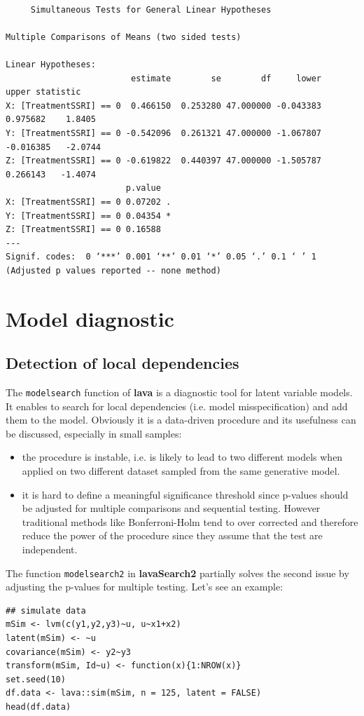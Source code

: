 \documentclass[12pt]{article}
\begin{document}
\begin{verbatim}

	 Simultaneous Tests for General Linear Hypotheses

Multiple Comparisons of Means (two sided tests) 

Linear Hypotheses:
                         estimate        se        df     lower     upper statistic
X: [TreatmentSSRI] == 0  0.466150  0.253280 47.000000 -0.043383  0.975682    1.8405
Y: [TreatmentSSRI] == 0 -0.542096  0.261321 47.000000 -1.067807 -0.016385   -2.0744
Z: [TreatmentSSRI] == 0 -0.619822  0.440397 47.000000 -1.505787  0.266143   -1.4074
                        p.value  
X: [TreatmentSSRI] == 0 0.07202 .
Y: [TreatmentSSRI] == 0 0.04354 *
Z: [TreatmentSSRI] == 0 0.16588  
---
Signif. codes:  0 ‘***’ 0.001 ‘**’ 0.01 ‘*’ 0.05 ‘.’ 0.1 ‘ ’ 1
(Adjusted p values reported -- none method)
\end{verbatim}

\clearpage 

\section{Model diagnostic}
\label{sec:orga0dd1ec}
\subsection{Detection of local dependencies}
\label{sec:org7d7da4b}

The \texttt{modelsearch} function of \textbf{lava} is a diagnostic tool for latent
variable models. It enables to search for local dependencies
(i.e. model misspecification) and add them to the model. Obviously it
is a data-driven procedure and its usefulness can be discussed,
especially in small samples:
\begin{itemize}
\item the procedure is instable, i.e. is likely to lead to two different
models when applied on two different dataset sampled from the same
generative model.
\item it is hard to define a meaningful significance threshold since
p-values should be adjusted for multiple comparisons and sequential
testing. However traditional methods like Bonferroni-Holm tend to
over corrected and therefore reduce the power of the procedure since
they assume that the test are independent.
\end{itemize}

The function \texttt{modelsearch2} in \textbf{lavaSearch2} partially solves the
second issue by adjusting the p-values for multiple testing. Let's see
an example:
\lstset{language=r,label= ,caption= ,captionpos=b,numbers=none}
\begin{lstlisting}
## simulate data
mSim <- lvm(c(y1,y2,y3)~u, u~x1+x2)
latent(mSim) <- ~u
covariance(mSim) <- y2~y3
transform(mSim, Id~u) <- function(x){1:NROW(x)}
set.seed(10)
df.data <- lava::sim(mSim, n = 125, latent = FALSE)
head(df.data)
\end{lstlisting}
\end{document}
